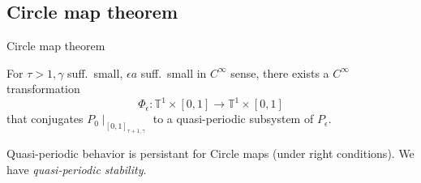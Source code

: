 \documentclass[]{beamer}
\newcommand{\e}{\epsilon}
\newcommand{\be}{\beta}
\newcommand{\g}{\gamma}
\newcommand{\om}{\omega}
\newcommand{\T}{\mathbb{T}}
\begin{document}
% 
% 
% 
% 
% 
% 
\subsection{Circle map theorem}

\begin{frame}{Circle map theorem}
    \begin{theorem}
        For $\tau > 1, \g$ suff.\ small, $\e a$ suff.\ small in $C^\infty$ sense,
        there exists a $C^\infty$ transformation
        \begin{equation*}
            \Phi_\e : \T^1 \times [0,1] \rightarrow \T^1 \times [0,1]
        \end{equation*}
        that conjugates $P_0 \! \mid_{[0,1]_{\tau + 1, \g}}$ to
        a quasi-periodic subsystem of $P_\e$.
    \end{theorem}

\medskip
\pause
Quasi-periodic behavior is persistant for Circle maps (under right conditions).
We have \emph{quasi-periodic stability}.
\end{frame}
\end{document}
